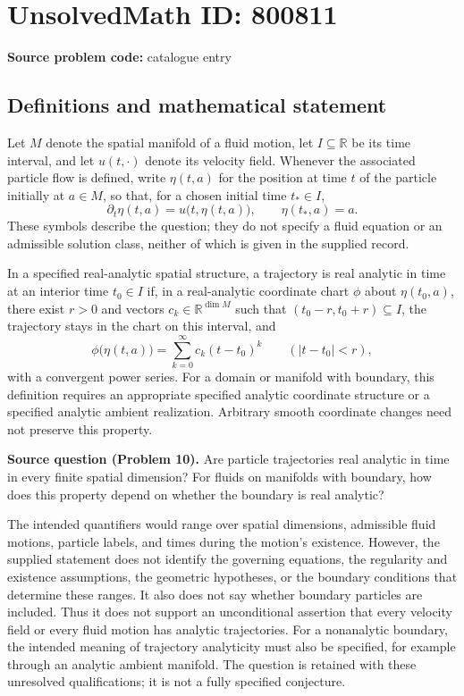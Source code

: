 \documentclass[11pt]{article}
\newcommand{\R}{\mathbb{R}}
\begin{document}
\section*{UnsolvedMath ID: 800811}
\textbf{Source problem code:} catalogue entry
\subsection{Definitions and mathematical statement}
Let \(M\) denote the spatial manifold of a fluid motion, let \(I\subseteq\R\) be its time interval, and let \(u(t,\cdot)\) denote its velocity field. Whenever the associated particle flow is defined, write \(\eta(t,a)\) for the position at time \(t\) of the particle initially at \(a\in M\), so that, for a chosen initial time \(t_*\in I\),
\[
\partial_t\eta(t,a)=u\bigl(t,\eta(t,a)\bigr),\qquad \eta(t_*,a)=a.
\]
These symbols describe the question; they do not specify a fluid equation or an admissible solution class, neither of which is given in the supplied record.

In a specified real-analytic spatial structure, a trajectory is real analytic in time at an interior time \(t_0\in I\) if, in a real-analytic coordinate chart \(\phi\) about \(\eta(t_0,a)\), there exist \(r>0\) and vectors \(c_k\in\R^{\dim M}\) such that \((t_0-r,t_0+r)\subseteq I\), the trajectory stays in the chart on this interval, and
\[
\phi\bigl(\eta(t,a)\bigr)=\sum_{k=0}^{\infty}c_k(t-t_0)^k
\qquad (|t-t_0|<r),
\]
with a convergent power series. For a domain or manifold with boundary, this definition requires an appropriate specified analytic coordinate structure or a specified analytic ambient realization. Arbitrary smooth coordinate changes need not preserve this property.

\textbf{Source question (Problem 10).} Are particle trajectories real analytic in time in every finite spatial dimension? For fluids on manifolds with boundary, how does this property depend on whether the boundary is real analytic?

The intended quantifiers would range over spatial dimensions, admissible fluid motions, particle labels, and times during the motion's existence. However, the supplied statement does not identify the governing equations, the regularity and existence assumptions, the geometric hypotheses, or the boundary conditions that determine these ranges. It also does not say whether boundary particles are included. Thus it does not support an unconditional assertion that every velocity field or every fluid motion has analytic trajectories. For a nonanalytic boundary, the intended meaning of trajectory analyticity must also be specified, for example through an analytic ambient manifold. The question is retained with these unresolved qualifications; it is not a fully specified conjecture.
\end{document}

